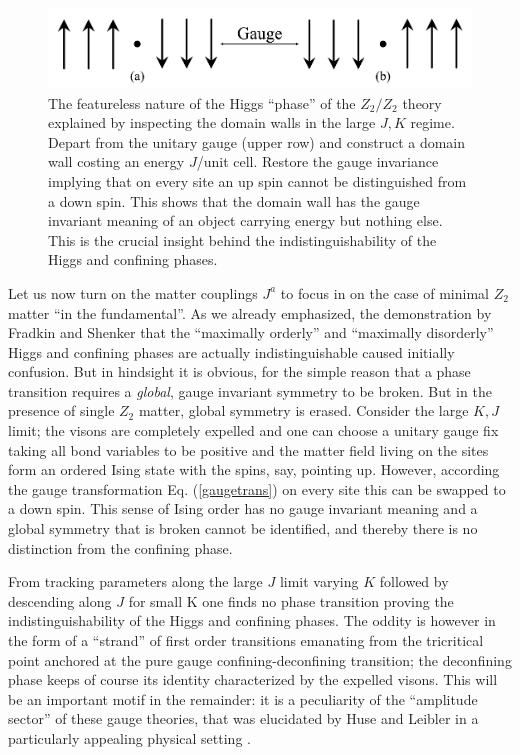 \begin{figure}[!h]
	\centering
	\includegraphics[scale=.4]{figures/chapter2/Z2Z2domainWall.pdf}
	\caption{The featureless nature of the Higgs ``phase'' of the $Z_2/Z_2$ theory explained by inspecting the domain walls in the large $J,K$ regime. Depart from the unitary gauge (upper row) and construct a domain wall costing an energy $J$/unit cell. Restore the gauge invariance implying that on every site an up spin cannot be distinguished from a down spin. This shows that  the domain wall has the gauge invariant meaning of an object carrying energy but nothing else. This is the crucial insight behind the indistinguishability of the Higgs and confining phases.}
	\label{Z2Z2domainwall}
\end{figure} 


Let us now turn on the matter couplings $J^a$ to focus in on the case of minimal $Z_2$ matter ``in the fundamental''. As we already emphasized, the demonstration by Fradkin and Shenker \cite{Fradkinshenker} that the ``maximally orderly'' and ``maximally disorderly'' Higgs and confining phases are actually indistinguishable caused initially confusion. But in hindsight it is obvious, for the simple reason that a phase transition requires a {\em global}, gauge invariant symmetry to be broken. But in the presence of single $Z_2$ matter, global symmetry is erased. Consider the large $K,J$ limit; the visons are completely expelled and one can choose a unitary gauge fix taking all bond variables to be positive and the matter field living on the sites form an ordered Ising state with the spins, say, pointing up. However, according  the gauge transformation Eq. (\ref{gaugetrans}) on every site this can be swapped to a down spin. This sense of Ising order has no gauge invariant meaning and a global symmetry that is broken cannot be identified, and thereby there is no distinction from the confining phase. 

From tracking parameters along the large $J$ limit varying $K$ followed by descending along $J$ for small K one finds no phase transition proving the indistinguishability of the Higgs and confining phases. The oddity is however in the form of a ``strand'' of first order transitions emanating from the tricritical point anchored at the pure gauge confining-deconfining transition; the deconfining phase keeps of course its identity characterized by the expelled visons. This will be an important motif in the remainder: it is a peculiarity of the ``amplitude sector'' of  these gauge theories, that was elucidated by Huse and Leibler in a particularly appealing physical setting \cite{HuseLeibler}. 


